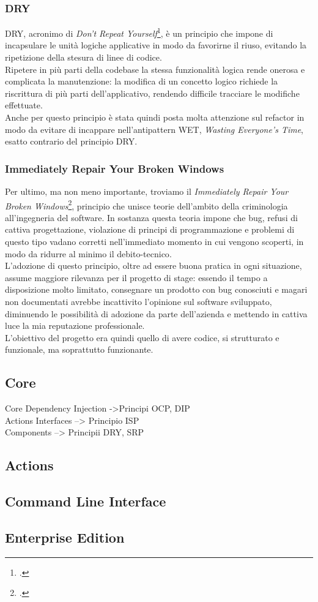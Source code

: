 \subsubsection{DRY}
DRY, acronimo di \textit{Don't Repeat Yourself}\footcite{article:drykiss}, è un principio che impone di incapsulare le unità logiche applicative in modo da favorirne il riuso, evitando la ripetizione della stesura di linee di codice. \\
Ripetere in più parti della codebase la stessa funzionalità logica rende onerosa e complicata la manutenzione: la modifica di un concetto logico richiede la riscrittura di più parti dell'applicativo, rendendo difficile tracciare le modifiche effettuate.\\
Anche per questo principio è stata quindi posta molta attenzione sul \gls{refactor} in modo da evitare di incappare nell'antipattern WET, \textit{Wasting Everyone's Time}, esatto contrario del principio DRY.
\subsubsection{Immediately Repair Your Broken Windows}
Per ultimo, ma non meno importante, troviamo il \textit{Immediately Repair Your Broken Windows}\footcite{article:brokenwindow}, principio che unisce teorie dell'ambito della criminologia all'ingegneria del software. In sostanza questa teoria impone che bug, refusi di cattiva progettazione, violazione di principi di programmazione e problemi di questo tipo vadano corretti nell'immediato momento in cui vengono scoperti, in modo da ridurre al minimo il \gls{debito-tecnico}. \\
L'adozione di questo principio, oltre ad essere buona pratica in ogni situazione, assume maggiore rilevanza per il progetto di stage: essendo il tempo a disposizione molto limitato, consegnare un prodotto con bug conosciuti e magari non documentati avrebbe incattivito l'opinione sul software sviluppato, diminuendo le possibilità di adozione da parte dell'azienda e mettendo in cattiva luce la mia reputazione professionale. \\
L'obiettivo del progetto era quindi quello di avere codice, si strutturato e funzionale, ma soprattutto funzionante.

\subsection{Core}
Core Dependency Injection ->Principi OCP, DIP \\
Actions Interfaces --> Principio ISP \\
Components --> Principii DRY, SRP \\
\subsection{Actions}
\subsection{Command Line Interface}
\subsection{Enterprise Edition}